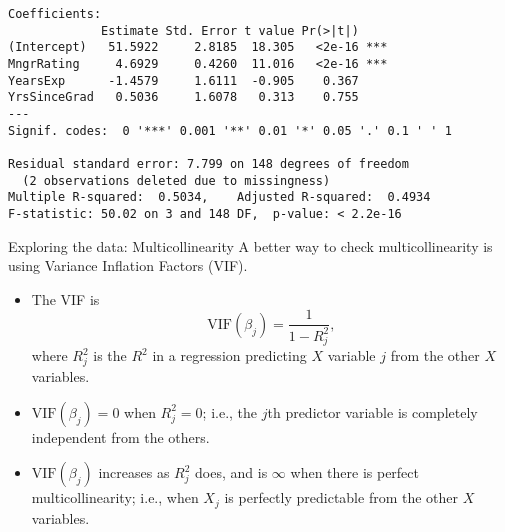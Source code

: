 \documentclass{beamer}\usepackage[]{graphicx}\usepackage[]{color}
\makeatletter
\newcommand{\hlopt}[1]{\textcolor[rgb]{1,0.894,0.769}{#1}}%
\newcommand{\hlstd}[1]{\textcolor[rgb]{1,0.894,0.769}{#1}}%
\newcommand{\hlkwd}[1]{\textcolor[rgb]{1,0.78,0.769}{#1}}%
\newenvironment{kframe}{%
 \def\at@end@of@kframe{}%
 \ifinner\ifhmode%
  \def\at@end@of@kframe{\end{minipage}}%
  \begin{minipage}{\columnwidth}%
 \fi\fi%
 \def\FrameCommand##1{\hskip\@totalleftmargin \hskip-\fboxsep
 \colorbox{shadecolor}{##1}\hskip-\fboxsep
     \hskip-\linewidth \hskip-\@totalleftmargin \hskip\columnwidth}%
 \MakeFramed {\advance\hsize-\width
   \@totalleftmargin\z@ \linewidth\hsize
   \@setminipage}}%
 {\par\unskip\endMakeFramed%
 \at@end@of@kframe}
\newenvironment{knitrout}{}{} %
\makeatother
\begin{document}
\begin{darkframes}
\begin{frame}[fragile]
\begin{knitrout}
\begin{kframe}
\begin{verbatim}
Coefficients:
             Estimate Std. Error t value Pr(>|t|)    
(Intercept)   51.5922     2.8185  18.305   <2e-16 ***
MngrRating     4.6929     0.4260  11.016   <2e-16 ***
YearsExp      -1.4579     1.6111  -0.905    0.367    
YrsSinceGrad   0.5036     1.6078   0.313    0.755    
---
Signif. codes:  0 '***' 0.001 '**' 0.01 '*' 0.05 '.' 0.1 ' ' 1

Residual standard error: 7.799 on 148 degrees of freedom
  (2 observations deleted due to missingness)
Multiple R-squared:  0.5034,	Adjusted R-squared:  0.4934 
F-statistic: 50.02 on 3 and 148 DF,  p-value: < 2.2e-16
\end{verbatim}
\end{kframe}
\end{knitrout}
    \end{frame}


    \begin{frame}[fragile]{Exploring the data: Multicollinearity}
      A better way to check multicollinearity is using Variance Inflation Factors (VIF).

      \begin{itemize}[<+->]
        \item The VIF is
          \[
            \text{VIF}(\beta_j) = \frac{1}{1 - R_j^2},
          \]
          where $R_j^2$ is the $R^2$ in a regression predicting $X$ variable $j$ from the other $X$ variables.
        \item $\text{VIF}(\beta_j)=0$ when $R_j^2=0$; i.e., the $j$th predictor variable is completely independent from the others.
        \item $\text{VIF}(\beta_j)$ increases as $R_j^2$ does, and is $\infty$ when there is perfect multicollinearity; i.e., when $X_j$ is perfectly predictable from the other $X$ variables.
      \end{itemize}
    \end{frame}


\end{darkframes}
\end{document}
